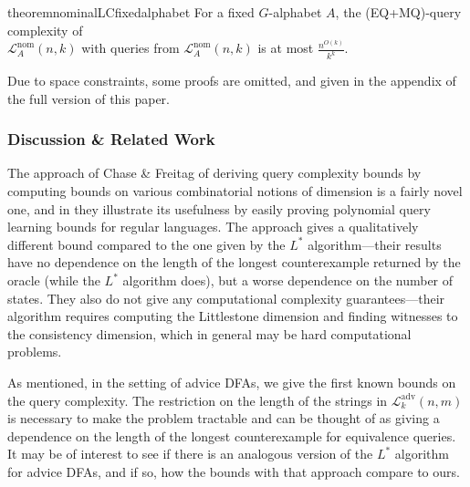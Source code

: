 \documentclass[11pt,a4paper]{amsart}
\theoremstyle{definition}
\newcommand{\mc}{\mathcal}
\newif\ifappendix
\begin{document}
\begin{restatable*}{theorem}{nominalLCfixedalphabet}
    For a fixed $G$-alphabet $A$, the (EQ+MQ)-query complexity of \\$\mc L^{\text{nom}}_A(n,k)$ with queries from $\mc L^{\text{nom}}_A(n,k)$ is at most $\frac{n^{O(k)}}{k^k}$.
\end{restatable*}



\ifappendix \else Due to space constraints, some proofs are omitted, and given in the appendix of the full version of this paper. \fi


\subsubsection{Discussion \& Related Work}

The approach of Chase \& Freitag of deriving query complexity bounds by computing bounds on various combinatorial notions of dimension is a fairly novel one, and in \cite{chase-freitag:bounds-in-query-learning} they illustrate its usefulness by easily proving polynomial query learning bounds for regular languages. 
The approach gives a qualitatively different bound compared to the one given by the $L^*$ algorithm---their results have no dependence on the length of the longest counterexample returned by the oracle (while the $L^*$ algorithm does), but a worse dependence on the number of states. 
They also do not give any computational complexity guarantees---their algorithm requires computing the Littlestone dimension and finding witnesses to the consistency dimension, which in general may be hard computational problems.

As mentioned, in the setting of advice DFAs, we give the first known bounds on the query complexity. 
The restriction on the length of the strings in $\mc L^{\text{adv}}_k(n,m)$ is necessary to make the problem tractable and can be thought of as giving a dependence on the length of the longest counterexample for equivalence queries.
It may be of interest to see if there is an analogous version of the $L^*$ algorithm for advice DFAs, and if so, how the bounds with that approach compare to ours.
\end{document}
